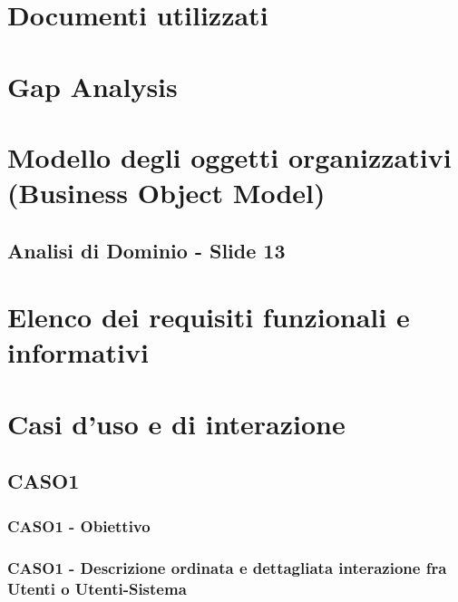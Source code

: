 \documentclass[12pt,a4paper,oneside]{article} %
\begin{document}
\section{Documenti utilizzati}

\newpage %

\section{Gap Analysis}

\newpage %

\section{Modello degli oggetti organizzativi (Business Object Model)}

\subsection{Analisi di Dominio - Slide 13}

\newpage %


\section{Elenco dei requisiti funzionali e informativi}



\newpage %


\section{Casi d'uso e di interazione}

\subsection{CASO1}
\subsubsection{CASO1 - Obiettivo}
\subsubsection{CASO1 - Descrizione ordinata e dettagliata interazione fra Utenti o Utenti-Sistema}
\end{document}
